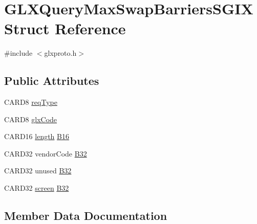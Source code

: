 \hypertarget{struct_g_l_x_query_max_swap_barriers_s_g_i_x}{}\section{G\+L\+X\+Query\+Max\+Swap\+Barriers\+S\+G\+IX Struct Reference}
\label{struct_g_l_x_query_max_swap_barriers_s_g_i_x}


{\ttfamily \#include $<$glxproto.\+h$>$}

\subsection*{Public Attributes}
\begin{DoxyCompactItemize}
\item 
C\+A\+R\+D8 \hyperlink{struct_g_l_x_query_max_swap_barriers_s_g_i_x_a6e38edd1b4e82bd89464c77a2ce6a4f4}{req\+Type}
\item 
C\+A\+R\+D8 \hyperlink{struct_g_l_x_query_max_swap_barriers_s_g_i_x_a8bbdf77b42ffd5d4c1bd006c024332b6}{glx\+Code}
\item 
C\+A\+R\+D16 \hyperlink{glcorearb_8h_ab9c919755bde3b34349e23a32b4e0fa7}{length} \hyperlink{struct_g_l_x_query_max_swap_barriers_s_g_i_x_a68ee35b93930856f1e67ae4c24d1223d}{B16}
\item 
C\+A\+R\+D32 vendor\+Code \hyperlink{struct_g_l_x_query_max_swap_barriers_s_g_i_x_a84df3fa8115f2a5616e3887bcb6b7093}{B32}
\item 
C\+A\+R\+D32 unused \hyperlink{struct_g_l_x_query_max_swap_barriers_s_g_i_x_a2e8b151cce24d4de298240cabe0f30e2}{B32}
\item 
C\+A\+R\+D32 \hyperlink{cad_8h_ae04e09e4e3831bfc1632c509ae37dcec}{screen} \hyperlink{struct_g_l_x_query_max_swap_barriers_s_g_i_x_a280399c96196243efe9713d36dfa6523}{B32}
\end{DoxyCompactItemize}


\subsection{Member Data Documentation}
\mbox{\label{struct_g_l_x_query_max_swap_barriers_s_g_i_x_a68ee35b93930856f1e67ae4c24d1223d}} 
